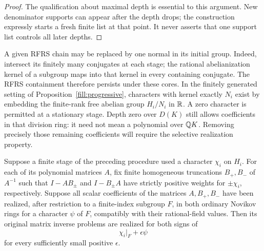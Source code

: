 \begin{proof}
The qualification about maximal depth is essential to this argument.
New denominator supports can appear after the depth drops; the
construction expressly starts a fresh finite list at that point.
It never asserts that one support list controls all later depths.
\end{proof}

A given RFRS chain may be replaced by one normal in its initial group.
Indeed, intersect its finitely many conjugates at each stage; the
rational abelianization kernel of a subgroup maps into that kernel
in every containing conjugate.  The RFRS containment therefore
persists under these cores. In the finitely generated setting of
Proposition~\ref{fill:progressive}, characters with kernel exactly
\(N_i\) exist by embedding the finite-rank free abelian group
\(H_i/N_i\) in \(\mathbb R\). A zero character is permitted at a stationary
stage. Depth zero over \(D(K)\) still allows coefficients in that
division ring: it need not mean a polynomial over \(\mathbb Q K\). Removing
precisely those remaining coefficients will require the selective
realization property.

\begin{lemma}\label{fill:recombine}
Suppose a finite stage of the preceding procedure used a character
\(\chi_i\) on \(H_i\). For each of its polynomial matrices \(A\), fix
finite homogeneous truncations \(B_+,B_-\) of \(A^{-1}\) such that
\(I-AB_\pm\) and \(I-B_\pm A\) have strictly positive weights for
\(\pm\chi_i\), respectively. Suppose all scalar coefficients of the
matrices \(A,B_+,B_-\) have been realized, after restriction to a
finite-index subgroup \(F\), in both ordinary Novikov rings for a
character \(\psi\) of \(F\), compatibly with their rational-field values.
Then its original matrix inverse problems are realized for both
signs of
\begin{equation}
 \chi_i|_F+\epsilon\psi
 \label{fill:perturb}
\end{equation}
for every sufficiently small positive \(\epsilon\).
\end{lemma}

